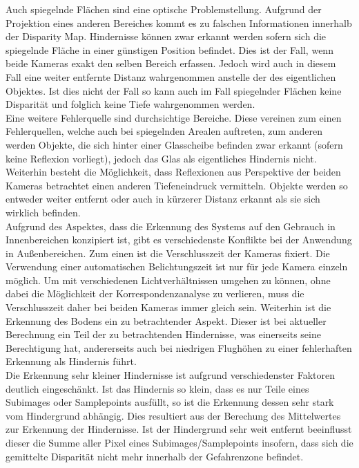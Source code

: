 \noindent
Auch spiegelnde Flächen sind eine optische Problemstellung. Aufgrund der Projektion eines anderen Bereiches kommt es zu falschen Informationen innerhalb der Disparity Map. Hindernisse können zwar erkannt werden sofern sich die spiegelnde Fläche in einer günstigen Position befindet. Dies ist der Fall, wenn beide Kameras exakt den selben Bereich erfassen. Jedoch wird auch in diesem Fall eine weiter entfernte Distanz wahrgenommen anstelle der des eigentlichen Objektes. 
Ist dies nicht der Fall so kann auch im Fall spiegelnder Flächen keine Disparität und folglich keine Tiefe wahrgenommen werden.\\
    
\noindent
Eine weitere Fehlerquelle sind durchsichtige Bereiche. Diese vereinen zum einen Fehlerquellen, welche auch bei spiegelnden Arealen auftreten, zum anderen werden Objekte, die sich hinter einer Glasscheibe befinden zwar erkannt (sofern keine Reflexion vorliegt), jedoch das Glas als eigentliches Hindernis nicht. Weiterhin besteht die Möglichkeit, dass Reflexionen aus Perspektive der beiden Kameras betrachtet einen anderen Tiefeneindruck vermitteln. Objekte werden so entweder weiter entfernt oder auch in kürzerer Distanz erkannt als sie sich wirklich befinden.\\

\noindent
Aufgrund des Aspektes, dass die Erkennung des Systems auf den Gebrauch in Innenbereichen konzipiert ist, gibt es verschiedenste Konflikte bei der Anwendung in Außenbereichen. Zum einen ist die Verschlusszeit der Kameras fixiert. Die Verwendung einer automatischen Belichtungszeit ist nur für jede Kamera einzeln möglich. Um mit verschiedenen Lichtverhältnissen umgehen zu können, ohne dabei die Möglichkeit der Korrespondenzanalyse zu verlieren, muss die Verschlusszeit daher bei beiden Kameras immer gleich sein. Weiterhin ist die Erkennung des Bodens ein zu betrachtender Aspekt. Dieser ist bei aktueller Berechnung ein Teil der zu betrachtenden Hindernisse, was einerseits seine Berechtigung hat, andererseits auch bei niedrigen Flughöhen zu einer fehlerhaften Erkennung als Hindernis führt.\\

\noindent
Die Erkennung sehr kleiner Hindernisse ist aufgrund verschiedenster Faktoren deutlich eingeschänkt. Ist das Hindernis so klein, dass es nur Teile eines Subimages oder Samplepoints ausfüllt, so ist die Erkennung dessen sehr stark vom Hindergrund abhängig. Dies resultiert aus der Berechung des Mittelwertes zur Erkennung der Hindernisse. Ist der Hindergrund sehr weit entfernt beeinflusst dieser die Summe aller Pixel eines Subimages/Samplepoints insofern, dass sich die gemittelte Disparität nicht mehr innerhalb der Gefahrenzone befindet. 


